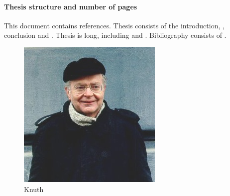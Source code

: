 \paragraph*{Thesis structure and number of pages}
This document contains  references.
Thesis consists of the introduction,
,
conclusion and
.
Thesis is 
 long, including
 and
.
Bibliography consists of
.

\begin{figure}
    \centering
    \includegraphics[width=0.6\linewidth]{images/knuth}
    \caption{Knuth}
    \label{fig:my_label}
\end{figure}